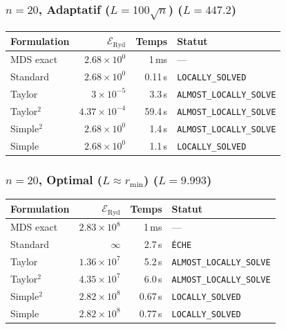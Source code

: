 \subsubsection{$n=20$, Adaptatif ($L{=}100\sqrt{n}$) ($L=447.2$)}
\begin{longtable}{@{}lrrl@{}}
  \toprule
  Formulation & $\mathcal{E}_{\mathrm{Ryd}}$ & Temps & Statut \\
  \midrule
  \endhead
  MDS exact & $2.68\times10^{0}$ & 1\,ms & --- \\
  Standard & $2.68\times10^{0}$ & 0.11\,s & \texttt{LOCALLY\_SOLVED} \\
  Taylor & $3\times10^{-5}$ & 3.3\,s & \texttt{ALMOST\_LOCALLY\_SOLVE} \\
  Taylor$^2$ & $4.37\times10^{-4}$ & 59.4\,s & \texttt{ALMOST\_LOCALLY\_SOLVE} \\
  Simple$^2$ & $2.68\times10^{0}$ & 1.4\,s & \texttt{ALMOST\_LOCALLY\_SOLVE} \\
  Simple & $2.68\times10^{0}$ & 1.1\,s & \texttt{LOCALLY\_SOLVED} \\
  \bottomrule
\end{longtable}

\subsubsection{$n=20$, Optimal ($L{\approx}r_{\min}$) ($L=9.993$)}
\begin{longtable}{@{}lrrl@{}}
  \toprule
  Formulation & $\mathcal{E}_{\mathrm{Ryd}}$ & Temps & Statut \\
  \midrule
  \endhead
  MDS exact & $2.83\times10^{8}$ & 1\,ms & --- \\
  Standard & $\infty$ & 2.7\,s & \texttt{ÉCHE} \\
  Taylor & $1.36\times10^{7}$ & 5.2\,s & \texttt{ALMOST\_LOCALLY\_SOLVE} \\
  Taylor$^2$ & $4.35\times10^{7}$ & 6.0\,s & \texttt{ALMOST\_LOCALLY\_SOLVE} \\
  Simple$^2$ & $2.82\times10^{8}$ & 0.67\,s & \texttt{LOCALLY\_SOLVED} \\
  Simple & $2.82\times10^{8}$ & 0.77\,s & \texttt{LOCALLY\_SOLVED} \\
  \bottomrule
\end{longtable}

